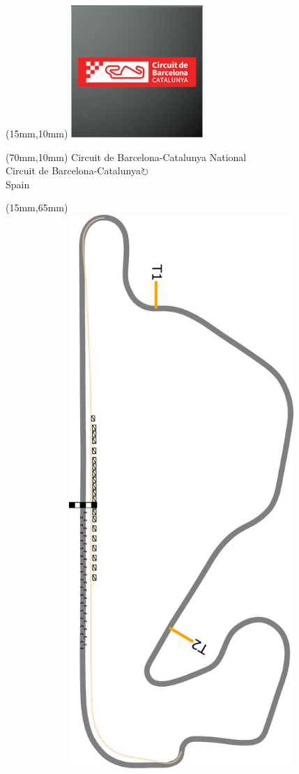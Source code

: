 \null\newpage
\begin{textblock*}{50mm}(15mm,10mm)%
\includegraphics[width=50mm]{LG/2015-05-20_00078.png}
\end{textblock*}
\begin{textblock*}{130mm}(70mm,10mm)%
{\fontsize{20}{20}\selectfont Circuit de Barcelona-Catalunya National\\}
{\fontsize{16}{16}\selectfont Circuit de Barcelona-Catalunya\hfill \Large$\circlearrowright$\\}
{\fontsize{12}{12}\selectfont Spain\\}
\end{textblock*}
\begin{textblock*}{185mm}(15mm,65mm)%
\centering
\mbox{\includegraphics[width=185mm,height=210mm,keepaspectratio]{PT/CBACNA.pdf}}
\end{textblock*}
